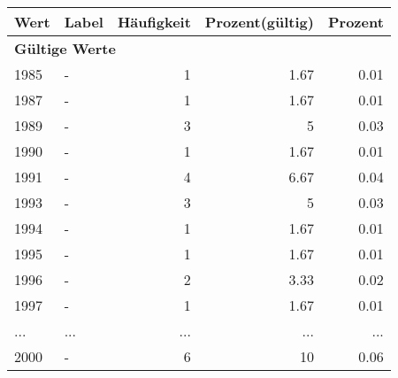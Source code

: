      \begin{longtable}{lXrrr}
     \toprule
     \textbf{Wert} & \textbf{Label} & \textbf{Häufigkeit} & \textbf{Prozent(gültig)} & \textbf{Prozent} \\
     \endhead
     \midrule
     \multicolumn{5}{l}{\textbf{Gültige Werte}}\\
        1985 & \multicolumn{1}{X}{-} & %
          \num{1} &
          \num[round-mode=places,round-precision=2]{1,67} &
          \num[round-mode=places,round-precision=2]{0,01} \\
        1987 & \multicolumn{1}{X}{-} & %
          \num{1} &
          \num[round-mode=places,round-precision=2]{1,67} &
          \num[round-mode=places,round-precision=2]{0,01} \\
        1989 & \multicolumn{1}{X}{-} & %
          \num{3} &
          \num[round-mode=places,round-precision=2]{5} &
          \num[round-mode=places,round-precision=2]{0,03} \\
        1990 & \multicolumn{1}{X}{-} & %
          \num{1} &
          \num[round-mode=places,round-precision=2]{1,67} &
          \num[round-mode=places,round-precision=2]{0,01} \\
        1991 & \multicolumn{1}{X}{-} & %
          \num{4} &
          \num[round-mode=places,round-precision=2]{6,67} &
          \num[round-mode=places,round-precision=2]{0,04} \\
        1993 & \multicolumn{1}{X}{-} & %
          \num{3} &
          \num[round-mode=places,round-precision=2]{5} &
          \num[round-mode=places,round-precision=2]{0,03} \\
        1994 & \multicolumn{1}{X}{-} & %
          \num{1} &
          \num[round-mode=places,round-precision=2]{1,67} &
          \num[round-mode=places,round-precision=2]{0,01} \\
        1995 & \multicolumn{1}{X}{-} & %
          \num{1} &
          \num[round-mode=places,round-precision=2]{1,67} &
          \num[round-mode=places,round-precision=2]{0,01} \\
        1996 & \multicolumn{1}{X}{-} & %
          \num{2} &
          \num[round-mode=places,round-precision=2]{3,33} &
          \num[round-mode=places,round-precision=2]{0,02} \\
        1997 & \multicolumn{1}{X}{-} & %
          \num{1} &
          \num[round-mode=places,round-precision=2]{1,67} &
          \num[round-mode=places,round-precision=2]{0,01} \\
       ... & ... & ... & ... & ... \\
        2000 & \multicolumn{1}{X}{-} & %
          \num{6} &
          \num[round-mode=places,round-precision=2]{10} &
          \num[round-mode=places,round-precision=2]{0,06} \\


\end{longtable}
